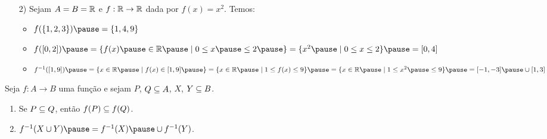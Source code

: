 \documentclass{beamer}
\begin{document}
    \begin{frame}
        \begin{exemplos}
            \begin{enumerate}
                \item[2)] Sejam $A = B = \mathbb{R}$ \pause e $f : \mathbb{R} \to \mathbb{R}$ \pause dada por $f(x) = x^2$. \pause Temos:\pause

                \vspace{.5cm}

                \begin{itemize}
                    \item $f(\{1, 2, 3\}) \pause = \{1, 4, 9\}$\pause

                    \vspace{.5cm}

                    \item $f([0,2]) \pause = \{f(x) \pause \in \real \pause \mid 0 \le x \pause \le 2 \pause \} = \{x^2 \pause \mid 0 \le x \le 2\} \pause = [0, 4]$\pause

                    \vspace{.5cm}

                    \item $f^{-1}([1, 9]) \pause = \{x \in \real \pause \mid f(x) \in [1, 9]\pause \} = \{ x \in \real \pause \mid 1 \le f(x) \le 9\} \pause = \{x \in \real \pause \mid 1 \le x^2 \pause \le 9\} \pause = [-1, -3] \pause \cup [1, 3]$\pause

                    \vspace{.5cm}
                \end{itemize}
            \end{enumerate}
        \end{exemplos}
    \end{frame}

    \begin{frame}
        \begin{proposicao}
            Seja $f : A \to B$ uma fun{\c c}{\~a}o \pause e sejam $P$, \pause $Q \subseteq A$, \pause $X$, \pause $Y \subseteq B$.\pause
            \begin{enumerate}[label={\roman*})]
                \item Se $P \subseteq Q$, \pause ent{\~a}o $f(P) \subseteq f(Q)$.\pause

                \vspace{.5cm}

                \item $f^{-1}(X \cup Y) \pause = f^{-1}(X) \pause \cup f^{-1}(Y)$.\pause
            \end{enumerate}
        \end{proposicao}
    \end{frame}
\end{document}
